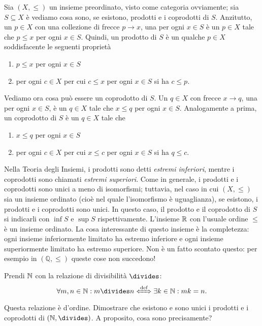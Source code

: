 \begin{esempio}
Sia \((X, \leqslant)\) un insieme preordinato, visto come categoria ovviamente; sia \(S \subseteq X\) è vediamo cosa sono, se esistono, prodotti e i coprodotti di \(S\).\newline
Anzitutto, un \(p \in X\) con una collezione di frecce \(p \to x\), una per ogni \(x \in S\) è un \(p \in X\) tale che \(p \leqslant x\) per ogni \(x \in S\). Quindi, un prodotto di \(S\) è un qualche \(p \in X\) soddisfacente le seguenti proprietà
%
\begin{enumerate}
\item \(p \leqslant x\) per ogni \(x \in S\)
\item per ogni \(c \in X\) per cui \(c \leqslant x\) per ogni \(x \in S\) si ha \(c \leqslant p\).
\end{enumerate}
%
Vediamo ora cosa può essere un coprodotto di \(S\). Un \(q \in X\) con frecce \(x \to q\), una per ogni \(x \in S\), è un \(q \in X\) tale che \(x \leqslant q\) per ogni \(x \in S\). Analogamente a prima, un coprodotto di \(S\) è un \(q \in X\) tale che
%
\begin{enumerate}
\item \(x \leqslant q\) per ogni \(x \in S\)
\item per ogni \(c \in X\) per cui \(x \leqslant c\) per ogni \(x \in S\) si ha \(q \leqslant c\).
\end{enumerate}
%
Nella Teoria degli Insiemi, i prodotti sono detti {\em estremi inferiori}, mentre i coprodotti sono chiamati {\em estremi superiori}. Come in generale, i prodotti e i coprodotti sono unici a meno di isomorfismi; tuttavia, nel caso in cui \((X, \leqslant)\) sia un insieme ordinato (cioè nel quale l'isomorfismo è uguaglianza), se esistono, i prodotti e i coprodotti sono unici. In questo caso, il prodotto e il coprodotto di \(S\) si indicarli con \(\inf S\) e \(\sup S\) rispettivamente.\newline
L'insieme \(\mathbb R\) con l'usuale ordine \(\leq\) è un insieme ordinato. La cosa interessante di questo insieme è la completezza: ogni insieme inferiormente limitato ha estremo inferiore e ogni insieme superiormente limitato ha estremo superiore. Non è un fatto scontato questo: per esempio in \((\mathbb Q, \leq)\) queste cose non succedono!
\end{esempio}

\begin{esercizio}
Prendi \(\mathbb N\) con la relazione di divisibilità \(\divides\):
\[\forall m, n \in \setN : m \divides n \xLeftrightarrow{\text{def}} \exists k \in \setN : mk = n.\]
Questa relazione è d'ordine. Dimostrare che esistono e sono unici i prodotti e i coprodotti di \((\setN, \divides)\). A proposito, cosa sono precisamente?
\end{esercizio}

